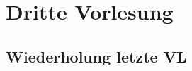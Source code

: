\documentclass[a4paper,10pt]{article}
\begin{document}
\sidebar
{}
\par \vspace*{5mm}


\section{Dritte Vorlesung}
\subsection{Wiederholung letzte VL}

	
\end{document}
